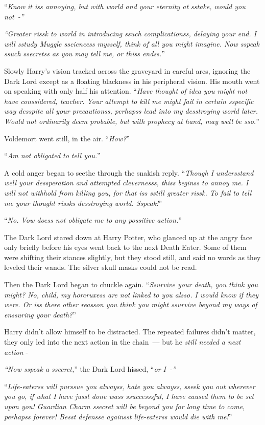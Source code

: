 ``\emph{Know it iss annoying, but with world and your eternity at sstake, would you not~-''}

\emph{``Greater rissk to world in introducing ssuch complicationss, delaying your end. I will sstudy Muggle ssciencess mysself, think of all you might imagine. Now sspeak ssuch ssecretss as you may tell me, or thiss endss.}''

Slowly Harry's vision tracked across the graveyard in careful arcs, ignoring the Dark Lord except as a floating blackness in his peripheral vision. His mouth went on speaking with only half his attention. ``\emph{Have thought of idea you might not have conssidered, teacher. Your attempt to kill me might fail in certain sspecific way desspite all your precautionss, perhapss lead into my desstroying world later. Would not ordinarily deem probable, but with prophecy at hand, may well be sso.}''

Voldemort went still, in the air. ``\emph{How?}''

``\emph{Am not obligated to tell you.}''

A cold anger began to seethe through the snakish reply. ``\emph{Though I undersstand well your dessperation and attempted clevernesss, thiss beginss to annoy me. I will not withhold from killing you, for that iss sstill greater rissk. To fail to tell me your thought rissks desstroying world. Sspeak!}''

``\emph{No. Vow doess not obligate me to any possitive action.}''

The Dark Lord stared down at Harry Potter, who glanced up at the angry face only briefly before his eyes went back to the next Death Eater. Some of them were shifting their stances slightly, but they stood still, and said no words as they leveled their wands. The silver skull masks could not be read.

Then the Dark Lord began to chuckle again. ``\emph{Ssurvive your death, you think you might? No, child, my horcruxess are not linked to you alsso. I would know if they were. Or iss there other reasson you think you might ssurvive beyond my ways of enssuring your death?}''

Harry didn't allow himself to be distracted. The repeated failures didn't matter, they only led into the next action in the chain~--- but he \emph{still needed a next action} -

\emph{``Now sspeak a ssecret,}'' the Dark Lord hissed, ``\emph{or I~-''}

``\emph{Life-eaterss will purssue you alwayss, hate you alwayss, sseek you out wherever you go, if what I have jusst done wass ssuccesssful, I have caused them to be set upon you! Guardian Charm ssecret will be beyond you for long time to come, perhapss forever! Besst defensse againsst life-eaterss would die with me!}''

